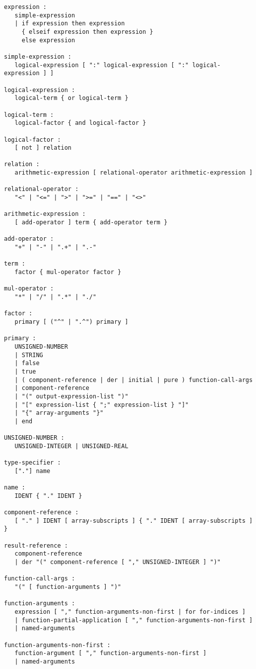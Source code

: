 \begin{lstlisting}[language=grammar]
expression :
   simple-expression
   | if expression then expression
     { elseif expression then expression }
     else expression

simple-expression :
   logical-expression [ ":" logical-expression [ ":" logical-expression ] ]

logical-expression :
   logical-term { or logical-term }

logical-term :
   logical-factor { and logical-factor }

logical-factor :
   [ not ] relation

relation :
   arithmetic-expression [ relational-operator arithmetic-expression ]

relational-operator :
   "<" | "<=" | ">" | ">=" | "==" | "<>"

arithmetic-expression :
   [ add-operator ] term { add-operator term }

add-operator :
   "+" | "-" | ".+" | ".-"

term :
   factor { mul-operator factor }

mul-operator :
   "*" | "/" | ".*" | "./"

factor :
   primary [ ("^" | ".^") primary ]

primary :
   UNSIGNED-NUMBER
   | STRING
   | false
   | true
   | ( component-reference | der | initial | pure ) function-call-args
   | component-reference
   | "(" output-expression-list ")"
   | "[" expression-list { ";" expression-list } "]"
   | "{" array-arguments "}"
   | end

UNSIGNED-NUMBER :
   UNSIGNED-INTEGER | UNSIGNED-REAL

type-specifier :
   ["."] name

name :
   IDENT { "." IDENT }

component-reference :
   [ "." ] IDENT [ array-subscripts ] { "." IDENT [ array-subscripts ] }

result-reference :
   component-reference
   | der "(" component-reference [ "," UNSIGNED-INTEGER ] ")"

function-call-args :
   "(" [ function-arguments ] ")"

function-arguments :
   expression [ "," function-arguments-non-first | for for-indices ]
   | function-partial-application [ "," function-arguments-non-first ]
   | named-arguments

function-arguments-non-first :
   function-argument [ "," function-arguments-non-first ]
   | named-arguments


\end{lstlisting}
